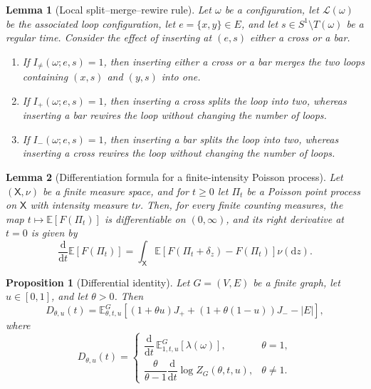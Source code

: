 \documentclass[10pt,a4paper]{amsart}
\newtheorem{lemma}{Lemma}
\newtheorem{proposition}{Proposition}
\newcommand{\Ebb}{\mathbb{E}}
\newcommand{\cL}{\mathcal{L}}
\newcommand{\dd}{\mathrm{d}}
\begin{document}
\begin{lemma}[Local split--merge--rewire rule]
\label{lem:local-surgery}
Let \(\omega\) be a configuration, let \(\cL(\omega)\) be the associated loop
configuration, let \(e=\{x,y\}\in E\), and let \(s\in S^1\setminus T(\omega)\) be a
regular time. Consider the effect of inserting at \((e,s)\) either a cross or a bar.

\begin{enumerate}[label=(\roman*)]
    \item If \(I_{\neq}(\omega;e,s)=1\), then inserting either a cross or a bar
    merges the two loops containing \((x,s)\) and \((y,s)\) into one.

    \item If \(I_+(\omega;e,s)=1\), then inserting a cross splits the loop into two,
    whereas inserting a bar rewires the loop without changing the number of loops.

    \item If \(I_-(\omega;e,s)=1\), then inserting a bar splits the loop into two,
    whereas inserting a cross rewires the loop without changing the number of loops.
\end{enumerate}
\end{lemma}

\begin{lemma}[Differentiation formula for a finite-intensity Poisson process]
\label{lem:poisson-diff}
Let \((\mathsf X,\nu)\) be a finite measure space, and for \(t\ge 0\) let \(\Pi_t\) be
a Poisson point process on \(\mathsf X\) with intensity measure \(t\nu\). Then, for
every finite counting measures, the map
\(t\mapsto \Ebb[F(\Pi_t)]\) is differentiable on \((0,\infty)\), and its right
derivative at \(t=0\) is given by
\[
\frac{\dd}{\dd t}\Ebb[F(\Pi_t)]
=
\int_{\mathsf X}\Ebb\!\left[F(\Pi_t+\delta_z)-F(\Pi_t)\right]\nu(\dd z).
\]
\end{lemma}

\begin{proposition}[Differential identity]
\label{prop:exact-drift}
Let \(G=(V,E)\) be a finite graph, let \(u\in[0,1]\), and let \(\theta>0\). Then
\[
D_{\theta,u}(t)
=
\Ebb_{\theta,t,u}^G\!\left[
(1+\theta u)J_+ + (1+\theta(1-u))J_- - |E|
\right],
\]
where
\[
D_{\theta,u}(t)=
\begin{cases}
\dfrac{\dd}{\dd t}\,\Ebb_{1,t,u}^G[\lambda(\omega)], & \theta=1,\\[1.2ex]
\dfrac{\theta}{\theta-1}\dfrac{\dd}{\dd t}\log Z_G(\theta,t,u), & \theta\neq 1.
\end{cases}
\]
\end{proposition}
\end{document}
